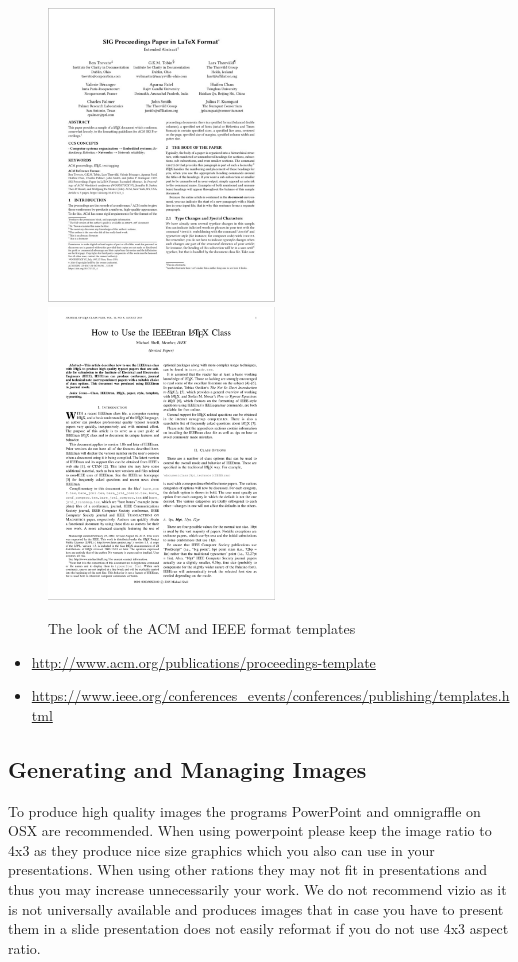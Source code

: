\begin{figure}[!h]
  \includegraphics[width=6cm]{images/doc/acm.png}
  \hfill
  \includegraphics[width=6cm]{images/doc/ieee.png}
\caption{The look of the ACM and IEEE format templates}
\end{figure}

\begin{itemize}

\item
  \url{http://www.acm.org/publications/proceedings-template}
\item
  \url{https://www.ieee.org/conferences_events/conferences/publishing/templates.html}
\end{itemize}

\subsection{Generating and Managing Images}\label{generating-images}

To produce high quality images the programs PowerPoint and omnigraffle
on OSX are recommended. When using powerpoint please keep the image
ratio to 4x3 as they produce nice size graphics which you also can use
in your presentations. When using other rations they may not fit in
presentations and thus you may increase unnecessarily your work. We do
not recommend vizio as it is not universally available and produces
images that in case you have to present them in a slide presentation
does not easily reformat if you do not use 4x3 aspect ratio.

